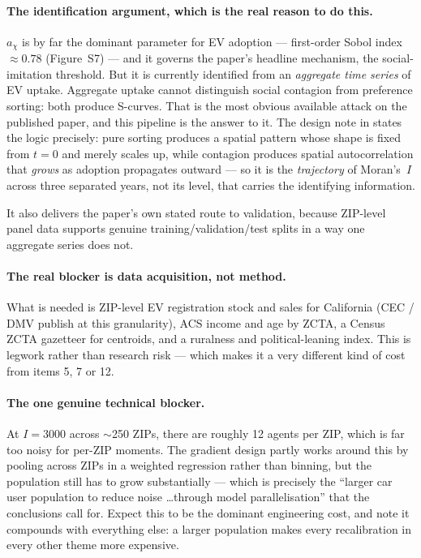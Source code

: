 \documentclass[11pt]{article}
\begin{document}
\paragraph{The identification argument, which is the real reason to do this.}
$a_\chi$ is by far the dominant parameter for EV adoption --- first-order
Sobol index $\approx 0.78$ (Figure~S7) --- and it governs the paper's
headline mechanism, the social-imitation threshold. But it is currently
identified from an \emph{aggregate time series} of EV uptake. Aggregate
uptake cannot distinguish social contagion from preference sorting: both
produce S-curves. That is the most obvious available attack on the published
paper, and this pipeline is the answer to it. The design note in
 states the logic precisely: pure sorting produces a
spatial pattern whose shape is fixed from $t=0$ and merely scales up, while
contagion produces spatial autocorrelation that \emph{grows} as adoption
propagates outward --- so it is the \emph{trajectory} of Moran's~$I$ across
three separated years, not its level, that carries the identifying
information.

It also delivers the paper's own stated route to validation, because
ZIP-level panel data supports genuine training/validation/test splits in a
way one aggregate series does not.

\paragraph{The real blocker is data acquisition, not method.} What is needed
is ZIP-level EV registration stock and sales for California (CEC / DMV
publish at this granularity), ACS income and age by ZCTA, a Census ZCTA
gazetteer for centroids, and a ruralness and political-leaning index. This
is legwork rather than research risk --- which makes it a very different kind
of cost from items 5, 7 or 12.

\paragraph{The one genuine technical blocker.} At $I=3000$ across
$\sim$250 ZIPs, there are roughly 12 agents per ZIP, which is far too noisy
for per-ZIP moments. The gradient design partly works around this by pooling
across ZIPs in a weighted regression rather than binning, but the
population still has to grow substantially --- which is precisely the
``larger car user population to reduce noise \dots through model
parallelisation'' that the conclusions call for. Expect this to be the
dominant engineering cost, and note it compounds with everything else: a
larger population makes every recalibration in every other theme more
expensive.
\end{document}
